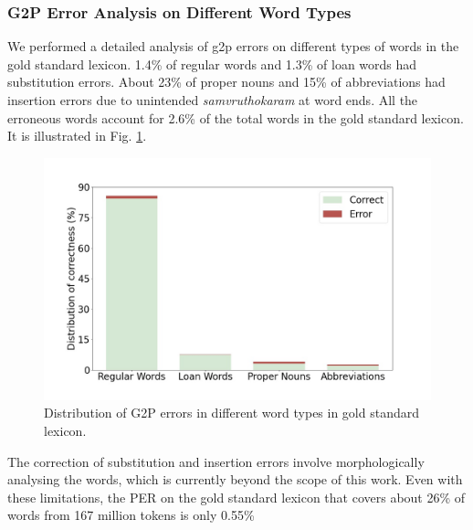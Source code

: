 \subsubsection{G2P Error Analysis on Different Word Types}

We performed a detailed analysis of \gls{g2p} errors on different types of words in
the gold standard lexicon. 1.4\% of regular words and 1.3\% of loan words had
substitution errors. About 23\% of proper nouns and 15\% of abbreviations had
insertion errors due to unintended \textit{samvruthokaram} at word ends. All
the erroneous words account for 2.6\% of the total words in the gold standard
lexicon. It is illustrated in Fig. \ref{fig:g2p-error}.

\begin{figure}[ht]
	\centering
	\includegraphics[width=0.8\linewidth]{g2p-error.jpg}
	\caption{Distribution of G2P errors in different word types in gold standard lexicon.}
	\label{fig:g2p-error}
\end{figure}


The correction of substitution and insertion errors involve morphologically
analysing the words, which is currently beyond the scope of this work. Even
with these limitations, the PER on the gold standard lexicon that covers about
26\% of words from 167 million tokens is only 0.55\%

